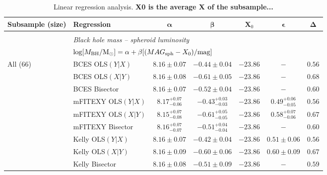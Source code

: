 \documentclass[preprint2]{emulateapj}
\begin{document}
\begin{table}
\centering
\caption{Linear regression analysis. {\bf X0 is the average X of the subsample...}}
\begin{tabular}{llccccc}
\hline
\hline
{\bf Subsample (size)} & {\bf Regression} & $\boldsymbol \alpha$ & $\boldsymbol \beta$ & $\boldsymbol X_0$ & $\boldsymbol \epsilon$ & $\boldsymbol \Delta$ \\ 
\hline 
\\
 & \multicolumn{6}{l}{\emph{Black hole mass -- spheroid luminosity}} \\
 & \multicolumn{6}{l}{$\log[M_{\rm BH}/{\rm M_\odot}] = \alpha + \beta[(MAG_{\rm sph} - X_0)/{\rm mag}]$} \\ [0.5em]
All (66)               & BCES OLS$(Y|X)$   & $8.16 \pm 0.07$ & $-0.44 \pm 0.04$ & $-23.86$ & $-$ & $0.56$ \\
                       & BCES OLS$(X|Y)$   & $8.16 \pm 0.08$ & $-0.61 \pm 0.05$ & $-23.86$ & $-$ & $0.68$ \\
                       & BCES Bisector     & $8.16 \pm 0.07$ & $-0.52 \pm 0.04$ & $-23.86$ & $-$ & $0.60$ \\
                       & mFITEXY OLS$(Y|X)$ & $8.17^{+0.07}_{-0.06}$ & $-0.43^{+0.03}_{-0.03}$ & $-23.86$ & $0.49^{+0.06}_{-0.05}$ & $0.56$ \\
                       & mFITEXY OLS$(X|Y)$ & $8.15^{+0.07}_{-0.08}$ & $-0.61^{+0.05}_{-0.05}$ & $-23.86$ & $0.58^{+0.07}_{-0.06}$ & $0.67$ \\
                       & mFITEXY Bisector   & $8.16^{+0.07}_{-0.07}$ & $-0.51^{+0.04}_{-0.04}$ & $-23.86$ & $-$    & $0.60$ \\
                       & Kelly OLS$(Y|X)$  & $8.16 \pm 0.07$ & $-0.42 \pm 0.04$ & $-23.86$ & $0.51 \pm 0.06$ & $0.56$ \\
                       & Kelly OLS$(X|Y)$  & $8.16 \pm 0.09$ & $-0.60 \pm 0.06$ & $-23.86$ & $0.60 \pm 0.09$ & $0.67$ \\
                       & Kelly Bisector    & $8.16 \pm 0.08$ & $-0.51 \pm 0.09$ & $-23.86$ & $-$    & $0.59$ \\ [0.5em]


\end{tabular}
\end{table}
\end{document}
